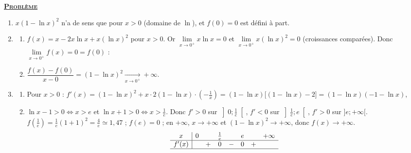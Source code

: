 \noindent \underline{\textsc{\textbf{Probl\`eme}}}
\begin{enumerate}
   \item {}
      $x(1 - \ln x)^2$ n'a de sens que pour $x > 0$ (domaine de $\ln$), et $f(0) = 0$ est d\'efini \`a part.
      \par\noindent\ansbox{$D_f = [0 ; +\infty[$.}
   \item
      \begin{enumerate}
         \item {}
            $f(x) = x - 2x\ln x + x(\ln x)^2$ pour $x > 0$. Or $\lim\limits_{x\to0^+} x\ln x = 0$ et $\lim\limits_{x\to0^+} x(\ln x)^2 = 0$
            (croissances compar\'ees). Donc $\lim\limits_{x\to0^+} f(x) = 0 = f(0)$ : 
         \item {}
            $\dfrac{f(x) - f(0)}{x - 0} = (1 - \ln x)^2 \xrightarrow[x\to0^+]{} +\infty$.\par\noindent
            \par\noindent{}
      \end{enumerate}
   \item
      \begin{enumerate}
         \item {}
            Pour $x > 0$ : $f'(x) = (1 - \ln x)^2 + x \cdot 2(1 - \ln x)\cdot\left(-\frac{1}{x}\right) = (1 - \ln x)\big[(1 - \ln x) - 2\big]
            = (1 - \ln x)(-1 - \ln x)$, 
         \item {}
            $\ln x - 1 > 0 \iff x > e$ et $\ln x + 1 > 0 \iff x > \frac{1}{e}$. Donc $f' > 0$ sur $\left]0 ; \frac{1}{e}\right[$,
            $f' < 0$ sur $\left]\frac{1}{e} ; e\right[$, $f' > 0$ sur $]e ; +\infty[$.
            $f\left(\frac{1}{e}\right) = \frac{1}{e}(1 + 1)^2 = \frac{4}{e} \simeq 1{,}47$ ; $f(e) = 0$ ;
            en $+\infty$, $x \to +\infty$ et $(1 - \ln x)^2 \to +\infty$, donc $f(x) \to +\infty$.
            \[
               \begin{array}{c|ccccccc}
                  x & 0 & & \frac{1}{e} & & e & & +\infty \\ \hline
                  f'(x) & & + & 0 & - & 0 & + & \\ \hline

\end{array}\]
\end{enumerate}
\end{enumerate}
